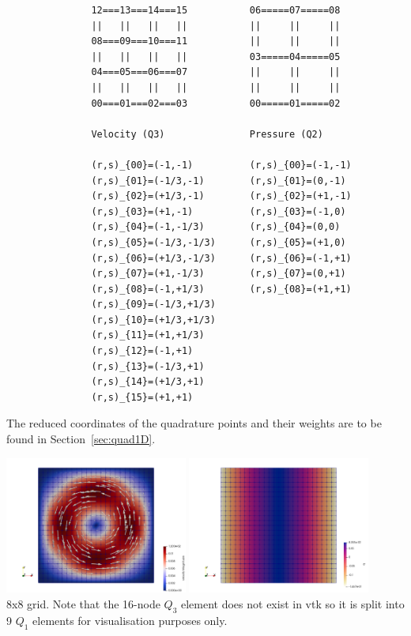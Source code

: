 \begin{verbatim}
               12===13===14===15           06=====07=====08
               ||   ||   ||   ||           ||     ||     ||
               08===09===10===11           ||     ||     ||
               ||   ||   ||   ||           03=====04=====05
               04===05===06===07           ||     ||     ||
               ||   ||   ||   ||           ||     ||     ||
               00===01===02===03           00=====01=====02

               Velocity (Q3)               Pressure (Q2)

               (r,s)_{00}=(-1,-1)          (r,s)_{00}=(-1,-1) 
               (r,s)_{01}=(-1/3,-1)        (r,s)_{01}=(0,-1) 
               (r,s)_{02}=(+1/3,-1)        (r,s)_{02}=(+1,-1) 
               (r,s)_{03}=(+1,-1)          (r,s)_{03}=(-1,0) 
               (r,s)_{04}=(-1,-1/3)        (r,s)_{04}=(0,0) 
               (r,s)_{05}=(-1/3,-1/3)      (r,s)_{05}=(+1,0) 
               (r,s)_{06}=(+1/3,-1/3)      (r,s)_{06}=(-1,+1) 
               (r,s)_{07}=(+1,-1/3)        (r,s)_{07}=(0,+1) 
               (r,s)_{08}=(-1,+1/3)        (r,s)_{08}=(+1,+1) 
               (r,s)_{09}=(-1/3,+1/3)
               (r,s)_{10}=(+1/3,+1/3)
               (r,s)_{11}=(+1,+1/3)
               (r,s)_{12}=(-1,+1)
               (r,s)_{13}=(-1/3,+1)
               (r,s)_{14}=(+1/3,+1)
               (r,s)_{15}=(+1,+1)
\end{verbatim}

The reduced coordinates of the quadrature points and their weights are to be found in 
Section~\ref{sec:quad1D}.

\begin{center}
\includegraphics[width=6cm]{python_codes/fieldstone_19/results/vel}
\includegraphics[width=6cm]{python_codes/fieldstone_19/results/pressure}\\
{\captionfont 8x8 grid. Note that the 16-node $Q_3$ element does not exist in vtk so it is split into 
9 $Q_1$ elements for visualisation purposes only.}
\end{center}

